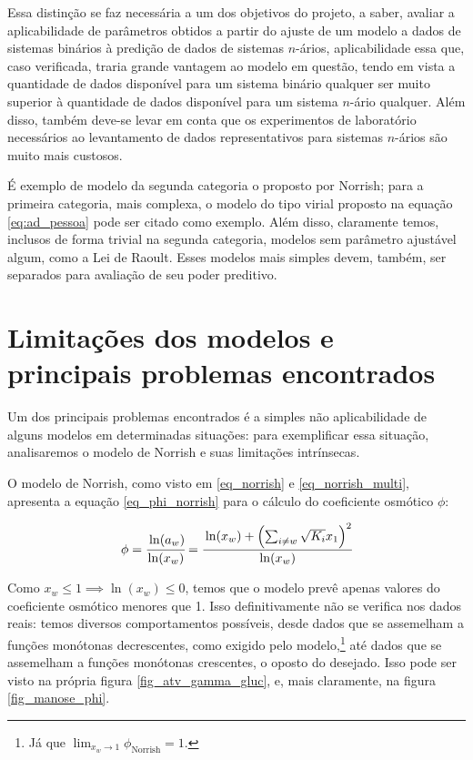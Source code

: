 \documentclass[
	12pt,				%
	openright,
	twoside,
	a4paper,			%
	brazil,			%
	french,				%
	spanish,			%
	english				%
	]{abntex2}
\begin{document}
Essa distinção se faz necessária a um dos objetivos do projeto, a saber, avaliar
a aplicabilidade de parâmetros obtidos a partir do ajuste de um modelo a dados
de sistemas binários à predição de dados de sistemas $n$-ários, aplicabilidade
essa que, caso verificada, traria grande vantagem ao modelo em questão, tendo em
vista a quantidade de dados disponível para um sistema binário qualquer
ser muito superior à quantidade de dados disponível para um sistema $n$-ário
qualquer. Além disso, também deve-se levar em conta que os experimentos de
laboratório necessários ao levantamento de dados representativos para sistemas
$n$-ários são muito mais custosos.

É exemplo de modelo da segunda categoria o proposto por Norrish; para a
primeira categoria, mais complexa, o modelo do tipo virial proposto na equação
\ref{eq:ad_pessoa} pode ser citado como exemplo. Além disso, claramente temos,
inclusos de forma trivial na segunda categoria, modelos sem parâmetro ajustável
algum, como a Lei de Raoult. Esses modelos mais simples devem, também, ser
separados para avaliação de seu poder preditivo.

\section{Limitações dos modelos e principais problemas encontrados}

Um dos principais problemas encontrados é a simples não aplicabilidade de
alguns modelos em determinadas situações: para exemplificar essa situação,
analisaremos o modelo de Norrish e suas limitações intrínsecas.

O modelo de Norrish, como visto em \ref{eq_norrish} e \ref{eq_norrish_multi},
apresenta a equação \ref{eq_phi_norrish} para o cálculo do coeficiente
osmótico $\phi$:

\begin{equation}
	\label{eq_phi_norrish}
	\phi = \cfrac{\ln(a_w)}{\ln(x_w)} = \cfrac{\ln(x_w) + \left(\sum_{ i\neq w}
	\sqrt{K_i}x_1\right)^2}{\ln(x_w)}
\end{equation}

Como $x_w \le 1 \implies \ln(x_w) \le 0$, temos que o modelo prevê apenas
valores do coeficiente osmótico menores que 1. Isso definitivamente não se
verifica nos dados reais: temos diversos comportamentos possíveis, desde
dados que se assemelham a funções monótonas decrescentes, como exigido pelo
modelo,\footnote{%
	Já que $\lim_{x_w \to 1}\phi_\text{Norrish} = 1$.
} até dados que se assemelham a funções monótonas crescentes, o oposto do
desejado. Isso pode ser visto na própria figura \ref{fig_atv_gamma_gluc}, e,
mais claramente, na figura \ref{fig_manose_phi}.
\end{document}
